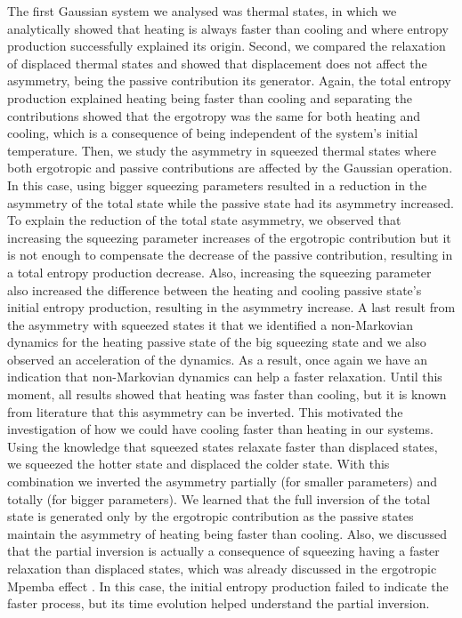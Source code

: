 The first Gaussian system we analysed was thermal states, in which we analytically showed that heating is always faster than cooling and where entropy production successfully explained its origin. Second, we compared the relaxation of displaced thermal states and showed that displacement does not affect the asymmetry, being the passive contribution its generator. Again, the total entropy production explained heating being faster than cooling and separating the contributions showed that the ergotropy was the same for both heating and cooling, which is a consequence of being independent of the system's initial temperature. Then, we study the asymmetry in squeezed thermal states where both ergotropic and passive contributions are affected by the Gaussian operation. In this case, using bigger squeezing parameters resulted in a reduction in the asymmetry of the total state while the passive state had its asymmetry increased. To explain the reduction of the total state asymmetry, we observed that increasing the squeezing parameter increases of the ergotropic contribution but it is not enough to compensate the decrease of the passive contribution, resulting in a total entropy production decrease. Also, increasing the squeezing parameter also increased the difference between the heating and cooling passive state's initial entropy production, resulting in the asymmetry increase. A last result from the asymmetry with squeezed states it that we identified a non-Markovian dynamics for the heating passive state of the big squeezing state and we also observed an acceleration of the dynamics. As a result, once again we have an indication that non-Markovian dynamics can help a faster relaxation. Until this moment, all results showed that heating was faster than cooling, but it is known from literature that this asymmetry can be inverted. This motivated the investigation of how we could have cooling faster than heating in our systems. Using the knowledge that squeezed states relaxate faster than displaced states, we squeezed the hotter state and displaced the colder state. With this combination we inverted the asymmetry partially (for smaller parameters) and totally (for bigger parameters). We learned that the full inversion of the total state is generated only by the ergotropic contribution as the passive states maintain the asymmetry of heating being faster than cooling. Also, we discussed that the partial inversion is actually a consequence of squeezing having a faster relaxation than displaced states, which was already discussed in the ergotropic Mpemba effect \cite{medina-2025}. In this case, the initial entropy production failed to indicate the faster process, but its time evolution helped understand the partial inversion. 

